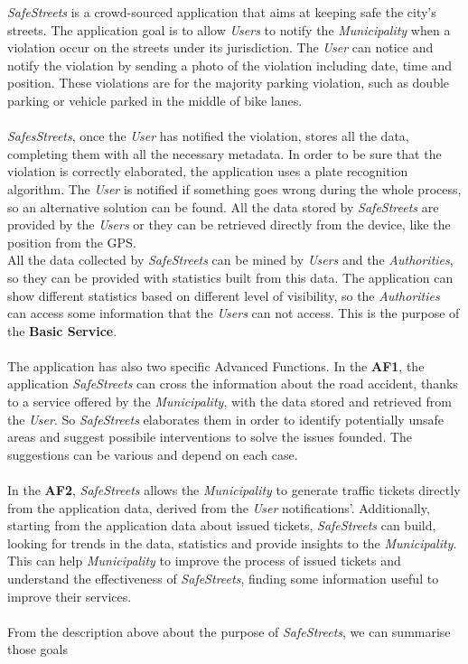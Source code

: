 \documentclass {article}
\begin{document}
	{\it SafeStreets} is a crowd-sourced application that aims at keeping safe the city's streets. The application goal is to allow {\it Users} to notify the {\it Municipality} when a violation occur on the streets under its jurisdiction. The {\it User} can notice and notify the violation by sending a photo of the violation including date, time and position. These violations are for the majority parking violation, such as double parking or vehicle parked in the middle of bike lanes. \\ \\
	{\it SafesStreets}, once the {\it User} has notified the violation, stores all the data, completing them with all the necessary metadata. In order to be sure that the violation is correctly elaborated, the application uses a plate recognition algorithm. The {\it User} is notified if something goes wrong during the whole process, so an alternative solution can be found. All the data stored by {\it SafeStreets} are provided by the {\it Users} or they can be retrieved directly from the device, like the position from the GPS.\\
	All the data collected by {\it SafeStreets} can be mined by {\it Users} and the {\it Authorities}, so they can be provided with statistics built from this data. The application can show different statistics based on different level of visibility, so the {\it Authorities} can access some information that the {\it Users} can not access. This is the purpose of the {\bf Basic Service}. \\ \\
	The application has also two specific Advanced Functions. In the {\bf AF1}, the application {\it SafeStreets} can cross the information about the road accident, thanks to a service offered by the {\it Municipality}, with the data stored and retrieved from the {\it User}. So {\it SafeStreets} elaborates them in order to identify potentially unsafe areas and suggest possibile interventions to solve the issues founded. The suggestions can be various and depend on each case. \\ \\
	In the   {\bf AF2}, {\it SafeStreets} allows the {\it Municipality} to generate traffic tickets directly from the application data, derived from the {\it User} notifications'. Additionally, starting from the application data about issued tickets, {\it SafeStreets} can build, looking for trends in the data, statistics and provide insights to the {\it Municipality}. This can help {\it Municipality} to improve the process of issued tickets and understand the effectiveness of {\it SafeStreets}, finding some information useful to improve their services. \\ \\
	From the description above about the purpose of {\it SafeStreets}, we can summarise those goals
		
\end{document}

